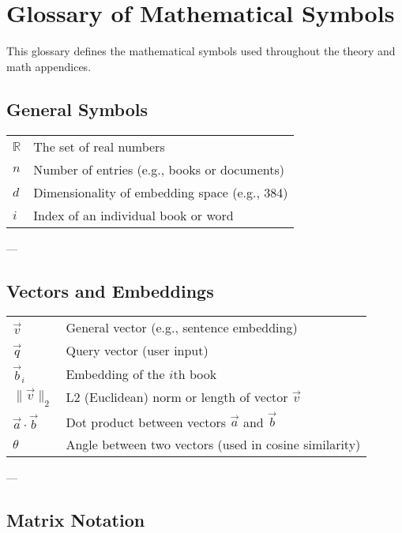 \appendix
\chapter{Glossary of Mathematical Symbols}
\label{appendix:symbols}

This glossary defines the mathematical symbols used throughout the theory and math appendices.

\section*{General Symbols}

\begin{tabular}{lp{10cm}}
    $\mathbb{R}$ & The set of real numbers \\
    $n$ & Number of entries (e.g., books or documents) \\
    $d$ & Dimensionality of embedding space (e.g., 384) \\
    $i$ & Index of an individual book or word \\
\end{tabular}

\vspace{1em}

---

\section*{Vectors and Embeddings}

\begin{tabular}{lp{10cm}}
    $\vec{v}$ & General vector (e.g., sentence embedding) \\
    $\vec{q}$ & Query vector (user input) \\
    $\vec{b}_i$ & Embedding of the $i$th book \\
    $\|\vec{v}\|_2$ & L2 (Euclidean) norm or length of vector $\vec{v}$ \\
    $\vec{a} \cdot \vec{b}$ & Dot product between vectors $\vec{a}$ and $\vec{b}$ \\
    $\theta$ & Angle between two vectors (used in cosine similarity) \\
\end{tabular}

\vspace{1em}

---

\section*{Matrix Notation}

